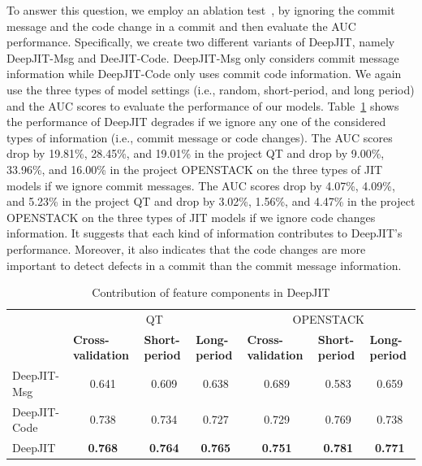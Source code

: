 To answer this question, we employ an ablation test~\cite{korbar2017deep, liu2017deep}, by ignoring the commit message and the code change in a commit and then evaluate the AUC performance. Specifically, we create two different variants of DeepJIT, namely DeepJIT-Msg and DeeJIT-Code. DeepJIT-Msg only considers commit message information while DeepJIT-Code only uses commit code information. We again use the three types of model settings (i.e., random, short-period, and long period) and the AUC scores to evaluate the performance of our models. Table~\ref{tab:variants} shows the performance of DeepJIT degrades if we ignore any one of the considered types of information (i.e., commit message or code changes). The AUC scores drop by 19.81\%, 28.45\%, and 19.01\% in the project QT and drop by 9.00\%, 33.96\%, and 16.00\% in the project OPENSTACK on the three types of JIT models if we ignore commit messages. The AUC scores drop by 4.07\%, 4.09\%, and 5.23\% in the project QT and drop by 3.02\%, 1.56\%, and 4.47\% in the project OPENSTACK on the three types of JIT models if we ignore code changes information. It suggests that each kind of information contributes to DeepJIT's performance. Moreover, it also indicates that the code changes are more important to detect defects in a commit than the commit message information. 

\begin{table}[t!]
  \centering
  \caption{Contribution of feature components in DeepJIT}
    \begin{tabular}{|l|c|c|c|c|c|c|}
    \hline
    \multirow{2}[4]{*}{} & \multicolumn{3}{c|}{QT} & \multicolumn{3}{c|}{OPENSTACK} \\
\cline{2-7}          & \multicolumn{1}{l|}{\textbf{Cross-validation}} & \multicolumn{1}{l|}{\textbf{Short-period}} & \multicolumn{1}{l|}{\textbf{Long-period}} & \multicolumn{1}{l|}{\textbf{Cross-validation}} & \multicolumn{1}{l|}{\textbf{Short-period}} & \multicolumn{1}{l|}{\textbf{Long-period}} \\
    \hline
    \hline
    DeepJIT-Msg & 0.641 & 0.609 & 0.638 & 0.689 & 0.583 & 0.659 \\
    \hline
    DeepJIT-Code & 0.738 & 0.734 & 0.727 & 0.729 & 0.769 & 0.738 \\
    \hline
    DeepJIT & \textbf{0.768} & \textbf{0.764} & \textbf{0.765} & \textbf{0.751} & \textbf{0.781} & \textbf{0.771} \\
    \hline
    \end{tabular}%
  \label{tab:variants}%

\end{table}%

